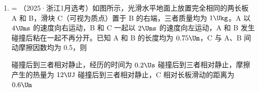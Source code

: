 \documentclass[\gkver]{gaokaozhenti}
\makeatletter
\newcommand{\tiinfo}[2]{{\small\color{gray}（#1）\textcolor{orange!85!black}{\nandu{#2}}}\hspace{0.4em}}
\newenvironment{tibody}
  {\begin{minipage}[t]{\linewidth}\@listdepth=\@ne\leavevmode\ignorespaces}
  {\end{minipage}}
\makeatother
\begin{document}
\begin{enumerate}[resume=tiku]
{	$v_{0} = a_{\text{滑}}t$

	解得

	$t = \frac{v_{0}}{\mu g}$

	则整个过程中木板滑动的距离为

	$x' = v_{0}t = \frac{v_{0}^{2}}{\mu g}$

	则拉力所做的功为

	$W = Fx' = mv_{0}^{2}$
}

\item
\begin{tibody}
\tiinfo{2025·浙江1月选考}{3}如图所示，光滑水平地面上放置完全相同的两长板 A 和 B，滑块 C（可视为质点）置于 B 的右端，三者质量均为 $1 \Ukg$。A 以 $4 \Ums$ 的速度向右运动，B 和 C 一起以 $2 \Ums$ 的速度向左运动，A 和 B 发生碰撞后粘在一起不再分开。已知 A 和 B 的长度均为 $0.75 \Um$，C 与 A、B 间动摩擦因数均为 0.5，则

\onepicture[w=8.00cm]{}

{碰撞后到三者相对静止，经历的时间为 $0.2 \Us$}
{碰撞后到三者相对静止，摩擦产生的热量为 $12 \UJ$}
{碰撞后到三者相对静止，C 相对长板滑动的距离为 $0.6 \Um$}
\end{tibody}


\end{enumerate}
\end{document}
